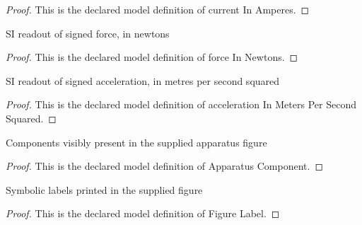 \begin{proof}
  This is the declared model definition of current In Amperes.
\end{proof}
\begin{definition}
  \label{def:physics:phyx-mini-0976:phyxminiproblems-problemphyxmini0976-forceinnewtons}
  SI readout of signed force, in newtons
\end{definition}
\begin{proof}
  This is the declared model definition of force In Newtons.
\end{proof}
\begin{definition}
  \label{def:physics:phyx-mini-0976:phyxminiproblems-problemphyxmini0976-accelerationinmeterspersecondsquared}
  SI readout of signed acceleration, in metres per second squared
\end{definition}
\begin{proof}
  This is the declared model definition of acceleration In Meters Per Second Squared.
\end{proof}
\begin{definition}
  \label{def:physics:phyx-mini-0976:phyxminiproblems-problemphyxmini0976-apparatuscomponent}
  Components visibly present in the supplied apparatus figure
\end{definition}
\begin{proof}
  This is the declared model definition of Apparatus Component.
\end{proof}
\begin{definition}
  \label{def:physics:phyx-mini-0976:phyxminiproblems-problemphyxmini0976-figurelabel}
  Symbolic labels printed in the supplied figure
\end{definition}
\begin{proof}
  This is the declared model definition of Figure Label.
\end{proof}
